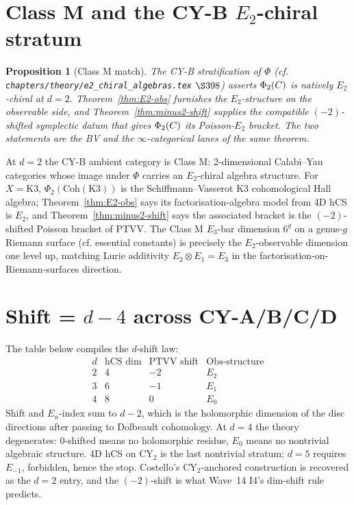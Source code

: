 \documentclass[11pt]{amsart}
\theoremstyle{plain}
\newtheorem{proposition}[theorem]{Proposition}
\theoremstyle{definition}
\begin{document}
\section{Class M and the CY-B $E_2$-chiral stratum}

\begin{proposition}[Class M match]
\label{prop:class-M-match}
The CY-B stratification of $\Phi$ (cf.
\texttt{chapters/theory/e2\_chiral\_algebras.tex} $\S398$) asserts
$\Phi_2(C)$ is natively $E_2$-chiral at $d=2$. Theorem~\ref{thm:E2-obs}
furnishes the $E_2$-structure on the observable side, and
Theorem~\ref{thm:minus2-shift} supplies the compatible $(-2)$-shifted
symplectic datum that gives $\Phi_2(C)$ its Poisson-$E_2$
bracket. The two statements are the BV and the $\infty$-categorical
lanes of the same theorem.
\end{proposition}

At $d=2$ the CY-B ambient category is Class M: 2-dimensional
Calabi--Yau categories whose image under $\Phi$ carries an
$E_2$-chiral algebra structure. For $X = \mathrm{K3}$,
$\Phi_2(\mathrm{Coh}(\mathrm{K3}))$ is the
Schiffmann--Vasserot K3 cohomological Hall algebra;
Theorem~\ref{thm:E2-obs} says its factorisation-algebra model from
4D hCS is $E_2$, and Theorem~\ref{thm:minus2-shift} says the
associated bracket is the $(-2)$-shifted Poisson bracket of PTVV.
The Class M $E_3$-bar dimension $6^g$ on a genus-$g$ Riemann surface
(cf. essential constants) is precisely the $E_2$-observable
dimension one level up, matching Lurie additivity $E_2\otimes E_1 = E_3$
in the factorisation-on-Riemann-surfaces direction.

\section{Shift = $d - 4$ across CY-A/B/C/D}

The table below compiles the $d$-shift law:
\[
\begin{array}{c|ccc}
d & \text{hCS dim} & \text{PTVV shift} & \text{Obs-structure} \\
\hline
2 & 4 & -2 & E_2 \\
3 & 6 & -1 & E_1 \\
4 & 8 & 0 & E_0
\end{array}
\]
Shift and $E_n$-index sum to $d-2$, which is the holomorphic
dimension of the disc directions after passing to Dolbeault
cohomology. At $d=4$ the theory degenerates: $0$-shifted means no
holomorphic residue, $E_0$ means no nontrivial algebraic structure.
4D hCS on CY$_2$ is the last nontrivial stratum; $d=5$ requires
$E_{-1}$, forbidden, hence the stop. Costello's CY$_2$-anchored
construction \cite{Costello2016} is recovered as the $d=2$ entry,
and the $(-2)$-shift is what Wave~14 I4's dim-shift rule predicts.
\end{document}
